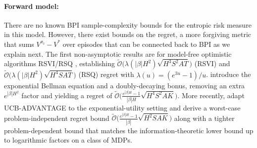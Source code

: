 \documentclass[final,12pt]{colt2026} %
\begin{document}
\paragraph{Forward model:} There are no known BPI sample-complexity bounds for the entropic risk measure in this model. However, there exist bounds on the regret, a more forgiving metric that sums $V^{\pi_t} - V^*$ over episodes that can be connected back to BPI as we explain next.  The first non-asymptotic results are for model-free optimistic algorithms RSVI/RSQ \citep{Fei2020RS}, establishing $\tilde{\mathcal{O}}\big(\lambda(|\beta|H^{2})\sqrt{H^{3}S^{2}AT}\big)$ (RSVI) and $\tilde{\mathcal{O}}\big(\lambda(|\beta|H^{2})\sqrt{H^{4}SAT}\big)$ (RSQ) regret with $\lambda(u)=(e^{3u}-1)/u$. \citet{FeiYCW21} introduce the exponential Bellman equation and a doubly-decaying bonus, removing an extra $e^{|\beta|H^{2}}$ factor and yielding a regret of 
$\tilde{\mathcal{O}}\Big(\frac{e^{|\beta|H}-1}{|\beta|H}
\sqrt{H^{4} S^{2} A K}
\Big)$. More recently, \citet{hu23b} adapt UCB-ADVANTAGE \citep{zhang2020almost} to the exponential-utility setting and derive a worst-case problem-independent regret bound
$\tilde{\mathcal O}\Big(\frac{e^{|\beta|H}-1}{|\beta|}\sqrt{H^{2}SAK}\Big)$
along with a tighter problem-dependent bound that matches the information-theoretic lower bound up to logarithmic factors on a class of MDPs.

\end{document}
